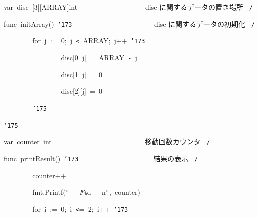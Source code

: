 \documentclass{article}
\begin{document}
\noindent
\mbox{}\hfill

\noindent
\mbox{}var{\tt\mc \ }disc{\tt\mc \ }[3][ARRAY]int{\tt\mc \ \ }{\tt\mc \ \ \ \ \ \ \ \ }{\tt\mc \ \ \ \ \ \ \ \ }\rm\mc {\tt /}{\tt *}\  {}disc に関するデータの置き場所
					   \hfill \rm\mc \ {\tt *}{\tt /}
\tt\mc 

\noindent
\mbox{}\hfill

\noindent
\mbox{}func{\tt\mc \ }initArray(){\tt\mc \ }{\tt\char'173}{\tt\mc \ \ \ \ \ \ }{\tt\mc \ \ \ \ \ \ \ \ }{\tt\mc \ \ \ \ \ \ \ \ }\rm\mc {\tt /}{\tt *}\  {}disc に関するデータの初期化
					   \hfill \rm\mc \ {\tt *}{\tt /}
\tt\mc 

\noindent
\mbox{}{\tt\mc \ \ \ \ \ \ \ \ }for{\tt\mc \ }j{\tt\mc \ }:={\tt\mc \ }0;{\tt\mc \ }j{\tt\mc \ }{\tt <}{\tt\mc \ }ARRAY;{\tt\mc \ }j++{\tt\mc \ }{\tt\char'173}

\noindent
\mbox{}{\tt\mc \ \ \ \ \ \ \ \ }{\tt\mc \ \ \ \ \ \ \ \ }disc[0][j]{\tt\mc \ }={\tt\mc \ }ARRAY{\tt\mc \ }{\tt -}{\tt\mc \ }j

\noindent
\mbox{}{\tt\mc \ \ \ \ \ \ \ \ }{\tt\mc \ \ \ \ \ \ \ \ }disc[1][j]{\tt\mc \ }={\tt\mc \ }0

\noindent
\mbox{}{\tt\mc \ \ \ \ \ \ \ \ }{\tt\mc \ \ \ \ \ \ \ \ }disc[2][j]{\tt\mc \ }={\tt\mc \ }0

\noindent
\mbox{}{\tt\mc \ \ \ \ \ \ \ \ }{\tt\char'175}

\noindent
\mbox{}{\tt\char'175}

\noindent
\mbox{}\hfill

\noindent
\mbox{}var{\tt\mc \ }counter{\tt\mc \ }int{\tt\mc \ }{\tt\mc \ \ \ \ \ \ \ \ }{\tt\mc \ \ \ \ \ \ \ \ }{\tt\mc \ \ \ \ \ \ \ \ }\rm\mc {\tt /}{\tt *}\  {}移動回数カウンタ \hfill \rm\mc \ {\tt *}{\tt /}
\tt\mc 

\noindent
\mbox{}\hfill

\noindent
\mbox{}func{\tt\mc \ }printResult(){\tt\mc \ }{\tt\char'173}{\tt\mc \ \ \ \ }{\tt\mc \ \ \ \ \ \ \ \ }{\tt\mc \ \ \ \ \ \ \ \ }\rm\mc {\tt /}{\tt *}\  {}結果の表示 \hfill \rm\mc \ {\tt *}{\tt /}
\tt\mc 

\noindent
\mbox{}{\tt\mc \ \ \ \ \ \ \ \ }counter++

\noindent
\mbox{}{\tt\mc \ \ \ \ \ \ \ \ }fmt.Printf({\tt "}{\tt -}{\tt -}{\tt -}{\tt\#}{\tt\%}d{\tt -}{\tt -}{\tt -}{\tt{}}n{\tt "},{\tt\mc \ }counter)

\noindent
\mbox{}{\tt\mc \ \ \ \ \ \ \ \ }for{\tt\mc \ }i{\tt\mc \ }:={\tt\mc \ }0;{\tt\mc \ }i{\tt\mc \ }{\tt <}={\tt\mc \ }2;{\tt\mc \ }i++{\tt\mc \ }{\tt\char'173}
\end{document}
